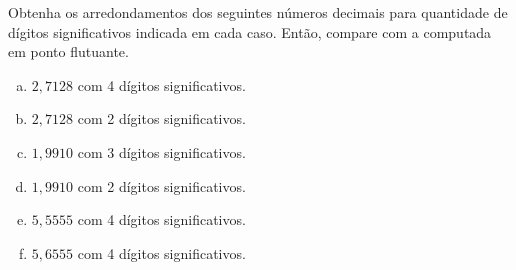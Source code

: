 \begin{exeresol}
  Obtenha os arredondamentos dos seguintes números decimais para quantidade de dígitos significativos indicada em cada caso. Então, compare com a computada em ponto flutuante.
  \begin{enumerate}[a)]
  \item $2,7128$ com 4 dígitos significativos.
  \item $2,7128$ com 2 dígitos significativos.
  \item $1,9910$ com 3 dígitos significativos.
  \item $1,9910$ com 2 dígitos significativos.
  \item $5,5555$ com 4 dígitos significativos.
  \item $5,6555$ com 4 dígitos significativos.
  \end{enumerate}
\end{exeresol}
